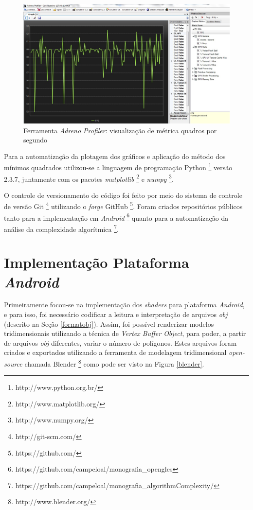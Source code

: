 	\begin{figure}[h]
	\centering
		\includegraphics[keepaspectratio=true,scale=0.35]{figuras/graph.jpg}
	\caption{Ferramenta \textit{Adreno Profiler}: visualização de métrica quadros por segundo}
	\label{graph}
	\end{figure}

	Para a automatização da plotagem dos gráficos e aplicação do método dos mínimos quadrados utilizou-se a linguagem de programação Python \footnote{http://www.python.org.br/} versão 2.3.7, juntamente com os pacotes  \textit{matplotlib} \footnote{http://www.matplotlib.org/} e  \textit{numpy} \footnote{http://www.numpy.org/}. 

	O controle de versionamento do código foi feito por meio do sistema de controle de versão Git \footnote{http://git-scm.com/} utilizando o \textit{forge} GitHub \footnote{https://github.com/}. Foram criados repositórios públicos tanto para a implementação em \textit{Android} \footnote{https://github.com/campeloal/monografia\_opengles} quanto para a automatização da análise da complexidade algorítmica \footnote{https://github.com/campeloal/monografia\_algorithmComplexity/}. 

\section{Implementação Plataforma \textit{Android}} 

	Primeiramente focou-se na implementação dos \textit{shaders} para plataforma \textit{Android}, e para isso, foi necessário codificar a leitura e interpretação de arquivos \textit{obj} (descrito na Seção \ref{formatobj}). Assim, foi possível renderizar modelos tridimensionais utilizando a técnica de \textit{Vertex Buffer Object}, para poder, a partir de arquivos \textit{obj} diferentes, variar o número de polígonos. Estes arquivos foram criados e exportados utilizando a ferramenta de modelagem tridimensional \textit{open-source} chamada Blender \footnote{http://www.blender.org/} como pode ser visto na Figura \ref{blender}.

